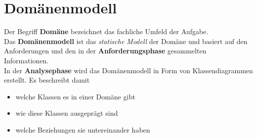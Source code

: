 \section{Domänenmodell}

\begin{tcolorbox}[title=Domänenmodell]
Der Begriff \textbf{Domäne} bezeichnet das fachliche Umfeld der Aufgabe.\\

\noindent
Das \textbf{Domänenmodell} ist das \textit{statische Modell} der Domäne und basiert auf den Anforderungen und den in der \textbf{Anforderungsphase} gesammelten Informationen.\\

\noindent
In der \textbf{Analysephase} wird das Domänenmodell in Form von Klassendiagrammen erstellt.
Es beschreibt damit


\begin{itemize}
    \item welche Klassen es in einer Domäne gibt
    \item wie diese Klassen ausgeprägt sind
    \item welche Beziehungen sie untereinander haben
\end{itemize}
\end{tcolorbox}